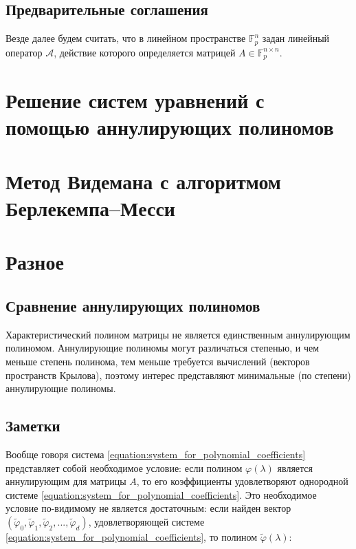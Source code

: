 \documentclass[a4paper,12pt]{book}
\newcommand{\gfpmatrix}[2]{\mathbb{F}^{#1 \times #2}_p}
\newcommand{\gfpvector}[1]{\mathbb{F}^{#1}_p}
\newcommand{\polynomial}[1]{ #1 (\lambda)}
\begin{document}
\section{Предварительные соглашения}

Везде далее будем считать, что в линейном пространстве $\gfpvector{n}$ задан линейный оператор $\mathcal A$, действие которого
определяется матрицей $A \in \gfpmatrix{n}{n}$.

\chapter{Решение систем уравнений с помощью аннулирующих полиномов}




\chapter{Метод Видемана с алгоритмом Берлекемпа--Месси}



\chapter{Разное}

\section{Сравнение аннулирующих полиномов}

Характеристический полином матрицы не является единственным аннулирующим полиномом. Аннулирующие полиномы могут различаться степенью, и
чем меньше степень полинома, тем меньше требуется вычислений (векторов пространств Крылова), поэтому интерес представляют минимальные (по
степени) аннулирующие полиномы.

\section{Заметки}

Вообще говоря система \eqref{equation:system_for_polynomial_coefficients} представляет собой необходимое условие: если полином
$\polynomial{\varphi}$ является аннулирующим для матрицы $A$, то его коэффициенты удовлетворяют однородной системе
\eqref{equation:system_for_polynomial_coefficients}. Это необходимое условие по-видимому не является достаточным: если найден вектор
$ \left ( \tilde \varphi_0, \tilde \varphi_1, \tilde \varphi_2, ..., \tilde \varphi_d \right ) $, удовлетворяющей системе
\eqref{equation:system_for_polynomial_coefficients}, то полином $\polynomial{\tilde \varphi}$:
\end{document}
